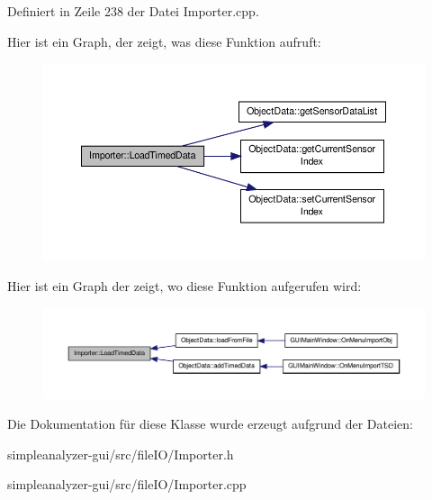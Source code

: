 Definiert in Zeile 238 der Datei Importer.\-cpp.



Hier ist ein Graph, der zeigt, was diese Funktion aufruft\-:\nopagebreak
\begin{figure}[H]
\begin{center}
\leavevmode
\includegraphics[width=350pt]{classImporter_a196e66a161a0102194580ec4b10895e5_cgraph}
\end{center}
\end{figure}




Hier ist ein Graph der zeigt, wo diese Funktion aufgerufen wird\-:\nopagebreak
\begin{figure}[H]
\begin{center}
\leavevmode
\includegraphics[width=350pt]{classImporter_a196e66a161a0102194580ec4b10895e5_icgraph}
\end{center}
\end{figure}




Die Dokumentation für diese Klasse wurde erzeugt aufgrund der Dateien\-:\begin{DoxyCompactItemize}
\item 
simpleanalyzer-\/gui/src/file\-I\-O/Importer.\-h\item 
simpleanalyzer-\/gui/src/file\-I\-O/Importer.\-cpp\end{DoxyCompactItemize}
